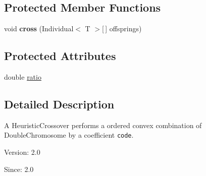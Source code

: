 \subsection*{Protected Member Functions}
\begin{CompactItemize}
\item 
\hypertarget{classjenes_1_1stage_1_1operator_1_1common_1_1_heuristic_crossover_3_01_t_01extends_01_double_chromosome_01_4_eb3cbe441f2588644e5129d7501c90ed}{
void \textbf{cross} (Individual$<$ T $>$\mbox{[}$\,$\mbox{]} offsprings)}
\label{classjenes_1_1stage_1_1operator_1_1common_1_1_heuristic_crossover_3_01_t_01extends_01_double_chromosome_01_4_eb3cbe441f2588644e5129d7501c90ed}

\end{CompactItemize}
\subsection*{Protected Attributes}
\begin{CompactItemize}
\item 
double \hyperlink{classjenes_1_1stage_1_1operator_1_1common_1_1_heuristic_crossover_3_01_t_01extends_01_double_chromosome_01_4_9cae7cf20e3154743a4dbe53054f513b}{ratio}
\end{CompactItemize}


\subsection{Detailed Description}
A HeuristicCrossover performs a ordered convex combination of DoubleChromosome by a coefficient {\tt code}.

\begin{Desc}
\item[Version:]2.0 \end{Desc}
\begin{Desc}
\item[Since:]2.0 \end{Desc}


